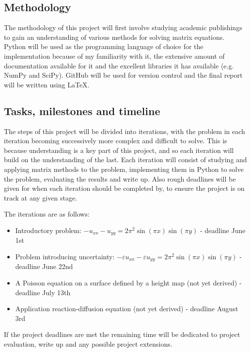 \documentclass{article}
\numberwithin{equation}{section}
\begin{document}
\subsection{Methodology}
The methodology of this project will first involve studying academic publishings to gain an understanding of various methods for solving matrix equations. Python will be used as the programming language of choice for the implementation because of my familiarity with it, the extensive amount of documentation available for it and the excellent libraries it has available (e.g. NumPy and SciPy). GitHub will be used for version control and the final report will be written using \LaTeX. 

\subsection{Tasks, milestones and timeline}
The steps of this project will be divided into iterations, with the problem in each iteration becoming successively more complex and difficult to solve. This is because understanding is a key part of this project, and so each iteration will build on the understanding of the last. Each iteration will consist of studying and applying matrix methods to the problem, implementing them in Python to solve the problem, evaluating the results and write up. Also rough deadlines will be given for when each iteration should be completed by, to ensure the project is on track at any given stage.

The iterations are as follows:
\begin{itemize}
\item Introductory problem: $-u_{xx} - u_{yy} = 2 \pi^2 \sin{(\pi x)} \sin{(\pi y)}$ - deadline June 1st
\item Problem introducing uncertainty: $-\varepsilon u_{xx} - \varepsilon u_{yy} = 2 \pi^2 \sin{(\pi x)} \sin{(\pi y)}$ - deadline June 22nd
\item A Poisson equation on a surface defined by a height map (not yet derived) - deadline July 13th
\item Application reaction-diffusion equation (not yet derived) - deadline August 3rd
\end{itemize}

If the project deadlines are met the remaining time will be dedicated to project evaluation, write up and any possible project extensions.

\newpage
\end{document}
